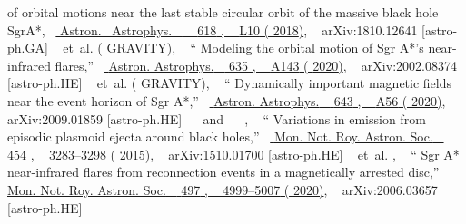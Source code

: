 \documentclass[aps,reprint,superscriptaddress,nofootinbib,floatfix,longbibliography,preprintnumbers]{revtex4-1}
\def\aap{Astron. \  Astrophys. \  }
\begin{document}
\begin{thebibliography}{139}
{{{{  of orbital motions near the last stable circular orbit of the massive black hole SgrA*}},} \  }\href {\doibase 10.1051/0004-6361/201834294} { { {\aap} \  }  {618} , \   {L10} ( {2018})}, \   {arXiv:1810.12641 [astro-ph.GA]} 
  \BibitemOpen
   { {~}  et~al.  ( {GRAVITY}), \  } {\enquote { {{Modeling the orbital motion of Sgr A*\textquoteright{}s near-infrared flares}},} \  }\href {\doibase 10.1051/0004-6361/201937233} { { {Astron. Astrophys.} \  }  {635} , \   {A143} ( {2020})}, \   {arXiv:2002.08374 [astro-ph.HE]} 
  \BibitemOpen
   { {~}  et~al.  ( {GRAVITY}), \  } {\enquote { {{Dynamically important magnetic fields near the event horizon of Sgr A*}},} \  }\href {\doibase 10.1051/0004-6361/202038283} { { {Astron. Astrophys.} \  }  {643} , \   {A56} ( {2020})}, \   {arXiv:2009.01859 [astro-ph.HE]} 
  \BibitemOpen
   { { \  } \  and \   { \  }, \  } {\enquote { {{Variations in emission from episodic plasmoid ejecta around black holes}},} \  }\href {\doibase 10.1093/mnras/stv2203} { { {Mon. Not. Roy. Astron. Soc.} \  }  {454} , \   {3283--3298} ( {2015})}, \   {arXiv:1510.01700 [astro-ph.HE]} 
  \BibitemOpen
   { {~}  et~al. , \  } {\enquote { {{Sgr A* near-infrared flares from reconnection events in a magnetically arrested disc}},} \  }\href {\doibase 10.1093/mnras/staa2288} { { {Mon. Not. Roy. Astron. Soc.} \  }  {497} , \   {4999--5007} ( {2020})}, \   {arXiv:2006.03657 [astro-ph.HE]} 

\end{thebibliography}
\end{document}
